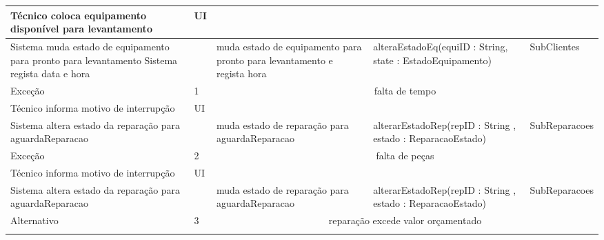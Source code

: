 \documentclass[../relatorio.tex]{subfiles}
\begin{document}
\begin{landscape}
\begin{table}[!h]
\begin{tabular}{|p{5cm}|p{1cm}|p{4cm}|p{6cm}|p{3cm}|}
            \\
            \hline
            Técnico coloca equipamento disponível para levantamento
                     & UI
                     & 
                     & 
                     & 
            \\
            \hline
            Sistema muda estado de equipamento para pronto para levantamento
            Sistema regista data e hora
                     & 
                     & muda estado de equipamento para pronto para levantamento e regista hora
                     & alteraEstadoEq(equiID : String, state : EstadoEquipamento)
                     & SubClientes
            \\
            \hline
            \rowcolor{red!30}
            Exceção  & 1                                                 &  \multicolumn{3}{c}{falta de tempo}\\
            \hline
            \rowcolor{yellow}
            Técnico informa motivo de interrupção
                     & UI
                     & 
                     & 
                     & 
            \\
            \hline
            Sistema altera estado da reparação para aguardaReparacao
                     & 
                     & muda estado de reparação para aguardaReparacao
                     & alterarEstadoRep(repID : String , estado : ReparacaoEstado)
                     & SubReparacoes
            \\
            \hline
            \rowcolor{red!30}
            Exceção  & 2                                                 &  \multicolumn{3}{c}{falta de peças}\\
            \hline
            \rowcolor{yellow}
            Técnico informa motivo de interrupção
                     & UI
                     & 
                     & 
                     & 
            \\
            \hline
            Sistema altera estado da reparação para aguardaReparacao
                     & 
                     & muda estado de reparação para aguardaReparacao
                     & alterarEstadoRep(repID : String , estado : ReparacaoEstado)
                     & SubReparacoes
            \\
            \hline
            \rowcolor{green!30}
            Alternativo  & 3                                                 &  \multicolumn{3}{c}{reparação excede valor orçamentado}\\
            \hline
            \rowcolor{yellow}

\end{tabular}
\end{table}
\end{landscape}
\end{document}
